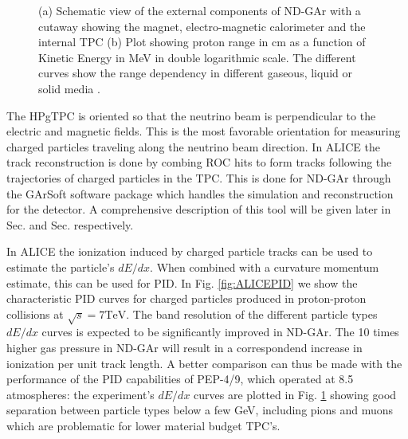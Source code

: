 \begin{figure}[t]
\begin{subfigure}[b]{0.47\textwidth}
         \caption{}
         \label{fig:PEPPID}
     \end{subfigure}
        \caption{(a) Schematic view of the external components of ND-GAr with a cutaway showing the magnet, electro-magnetic calorimeter and the internal TPC  (b) Plot showing proton range in cm as a function of Kinetic Energy in MeV in double logarithmic scale. The different curves show the range dependency in different gaseous, liquid or solid media \cite{Lu}. }
        \label{fig:PID}
\end{figure}

The HPgTPC is oriented so that the neutrino beam is perpendicular to the electric and magnetic fields. This is the most favorable orientation for measuring charged particles traveling along the neutrino beam direction. In ALICE the track reconstruction is done by combing ROC hits to form tracks following the trajectories of charged particles in the TPC. This is done for ND-GAr through the GArSoft software package which handles the simulation and reconstruction for the detector. A comprehensive description of this tool will be given later in Sec. and Sec. respectively. 

In ALICE the ionization induced by charged particle tracks can be used to estimate the particle's $dE/dx$. When combined with a curvature momentum estimate, this can be used for PID. In Fig. \ref{fig:ALICEPID} we show the characteristic PID curves for charged particles produced in proton-proton collisions at $\sqrt{s}=7 \textrm{TeV}$. The band resolution of the different particle types $dE/dx$ curves is expected to be significantly improved in ND-GAr. The 10 times higher gas pressure in ND-GAr will result in a correspondend increase in ionization per unit track length. A better comparison can thus be made with the performance of the PID capabilities of PEP-4/9, which operated at 8.5 atmospheres: the experiment's $dE/dx$ curves are plotted in Fig. \ref{fig:PEPPID} showing good separation between particle types below a few GeV, including pions and muons which are problematic for lower material budget TPC's. 

